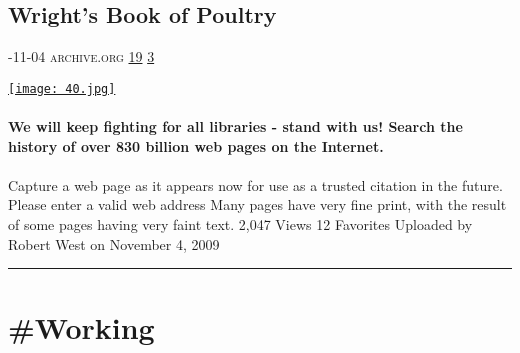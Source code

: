 \documentclass[10pt,a4paper]{article}
\begin{document}
\begin{multicols}{2}
\begin{minipage}{\linewidth}
\subsection{Wright's Book of Poultry}
\textsc{\footnotesize
{\scriptsize\faCalendar}-11-04 
{\scriptsize\faGlobe}\space 
archive.org 
{\scriptsize\faThumbsOUp}\space 
\href{http://news.ycombinator.com/item?id=37129799\&utm\_term=comment}{19} 
{\scriptsize\faComments}\space 
\href{http://news.ycombinator.com/item?id=37129799\&utm\_term=comment}{3} 
}
\par\medskip\noindent
\href{https://archive.org/details/wrightsbookofpou00wrig?utm\_source=hackernewsletter\&utm\_medium=email\&utm\_term=books}{
    \texttt{[image: 40.jpg]}
}
\end{minipage}
\paragraph{}
\textbf{We will keep fighting for all libraries - stand with us!
Search the history of over 830 billion
web pages
on the Internet.}
\paragraph{}

Capture a web page as it appears now for use as a trusted citation in the future.
Please enter a valid web address
Many pages have very fine print, with the result of some pages having very faint text.
2,047
Views
12
Favorites
Uploaded by
Robert West
on November 4, 2009
\par\noindent\textcolor{red}{\rule{\linewidth}{0.2mm}}
\vfill
\null
\end{multicols}

\newpage
\section{\#Working}
\end{document}
